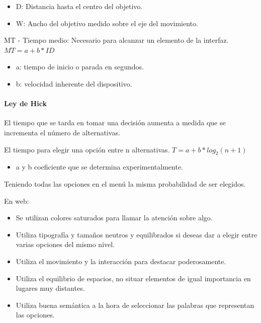\documentclass[12pt, twoside, openright]{report} %
\begin{document}
          \begin{itemize}
          
          \item
            D: Distancia hasta el centro del objetivo.
          \item
            W: Ancho del objetivo medido sobre el eje del movimiento.
          \end{itemize}

          MT - Tiempo medio: Necesario para alcanzar un elemento de la
          interfaz. \(MT = a+b*ID\)

          \begin{itemize}
          
          \item
            a: tiempo de inicio o parada en segundos.
          \item
            b: velocidad inherente del dispositivo.
          \end{itemize}

          
\paragraph{Ley de Hick}
El tiempo que se tarda en tomar una decisión
        aumenta a medida que se incrementa el número de alternativas.

          El tiempo para elegir una opción entre n alternativas.
          \(T=a+b*log_2 (n+1)\)

          \begin{itemize}
          
          \item
            a y b coeficiente que se determina experimentalmente.
          \end{itemize}

          Teniendo todas las opciones en el menú la misma probabilidad
          de ser elegidos.

          En web:

          \begin{itemize}
          
          \item
            Se utilizan colores saturados para llamar la atención sobre
            algo.
          \item
            Utiliza tipografía y tamaños neutros y equilibrados si
            deseas dar a elegir entre varias opciones del mismo nivel.
          \item
            Utiliza el movimiento y la interacción para destacar
            poderosamente.
          \item
            Utiliza el equilibrio de espacios, no situar elementos de
            igual importancia en lugares muy distantes.
          \item
            Utiliza buena semántica a la hora de seleccionar las
            palabras que representan las opciones.
          \end{itemize}
\end{document}
